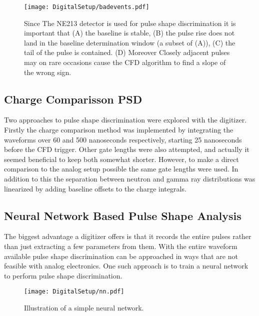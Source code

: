 \documentclass[main.tex]{subfiles}
\begin{document}
\begin{figure}[ht!]
    \centering
        \texttt{[image: DigitalSetup/badevents.pdf]}
        \caption[Examples of rejected digitized events]{Since The NE213 detector is used for pulse shape discrimination it is important that (A) the baseline is stable, (B) the pulse rise does not land in the baseline determination window (a subset of (A)), (C) the tail of the pulse is contained. (D) Moreover Closely adjacent pulses may on rare occasions cause the CFD algorithm to find a slope of the wrong sign.}
    \label{fig:badevents} 
\end{figure}

\subsection{Charge Comparisson PSD}
Two approaches to pulse shape discrimination were explored with the digitizer. Firstly the charge comparison method was implemented by integrating the waveforms over 60 and 500 nanoseconds respectively, starting 25 nanoseconds before the CFD trigger. Other gate lengths were also attempted, and actually it seemed beneficial to keep both somewhat shorter. However, to make a direct comparison to the analog setup possible the same gate lengths were used. In addition to this the separation between neutron and gamma ray distributions was linearized by adding baseline offsets to the charge integrals.

\subsection{Neural Network Based Pulse Shape Analysis}\label{sec:cnn}
The biggest advantage a digitizer offers is that it records the entire pulses rather than just extracting a few parameters from them. With the entire waveform available pulse shape discrimination can be approached in ways that are not feasible with analog electronics. One such approach is to train a neural network to perform pulse shape discrimination. 

\begin{figure}[ht!]
    \centering
        \texttt{[image: DigitalSetup/nn.pdf]}
        \caption[Illustration of a simple neural network]{Illustration of a simple neural network.}
    \label{fig:nn} 
\end{figure}
\end{document}
